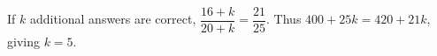 If $k$ additional answers are correct, $\dfrac{16+k}{20+k}=\dfrac{21}{25}$. Thus $400+25k=420+21k$, giving $k=\boxed5$.
